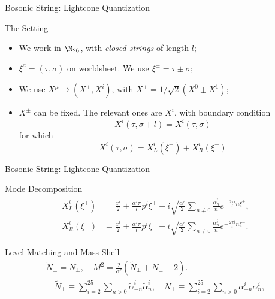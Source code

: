 \begin{frame}{Bosonic String: Lightcone Quantization}
	\begin{block}{The Setting}
		\begin{itemize}
			\item We work in $\M_{26}$, with \emph{closed strings} of length $l$;
			\item $\xi^a = (\tau,\sigma)$ on worldsheet. We use $\xi^\pm = \tau \pm \sigma$;
			\item We use $X^{{\mu}} \to (X^\pm, X^{{i}})$, with $X^\pm = {1}/{\sqrt{2}}(X^0 \pm X^1)$;
			\item $X^\pm$ can be fixed. The relevant ones are $X^i$, with \alert{boundary condition}
			      \begin{equation*}
				      X^i(\tau,\sigma+l) = X^i(\tau,\sigma)
			      \end{equation*}
			      for which
			      \setlength\abovedisplayskip{5pt}
			      \begin{equation*}
				      X^i (\tau,\sigma) = X^i_L (\xi^+) + X^i_R (\xi^-)
			      \end{equation*}
		\end{itemize}
	\end{block}
\end{frame}

\begin{frame}{Bosonic String: Lightcone Quantization}
	\begin{block}{Mode Decomposition}
		\setlength\abovedisplayskip{0pt}
		\begin{align*}
			X^i_L(\xi^+) & = \frac{x^i}{2} + \frac{\alpha'\pi}{l} p^i \xi^+ + i \sqrt{\frac{\alpha'}{2}} \sum_{n\neq 0} \frac{\tilde{\alpha}^i_n}{n}e^{-\frac{2\pi i}{l}n \xi^+}, \\
			X^i_R(\xi^-) & = \frac{x^i}{2} + \frac{\alpha'\pi}{l} p^i \xi^- + i \sqrt{\frac{\alpha'}{2}} \sum_{n\neq 0} \frac{{\alpha}^i_n}{n}e^{-\frac{2\pi i}{l}n \xi^-} .
		\end{align*}
	\end{block}
	\begin{block}{Level Matching and Mass-Shell}
		\setlength\abovedisplayskip{0pt}
		\begin{gather*}
			\tilde{N}_\perp =  N_\perp, \quad M^2 = \frac{2}{\alpha'} (\tilde{N}_\perp + N_\perp - 2) . \\
			\quad \tilde{N}_\perp \equiv \sum_{i=2}^{25}\sum_{n>0} \tilde{\alpha}^i_{-n} \tilde{\alpha}^i_n, \quad {N}_\perp \equiv \sum_{i=2}^{25}\sum_{n>0} {\alpha}^i_{-n} {\alpha}^i_n ,
		\end{gather*}
	\end{block}
\end{frame}

